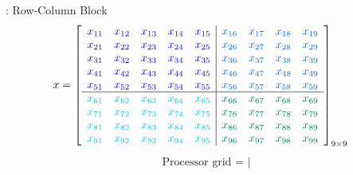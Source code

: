 \begin{frame}
  \begin{exampleblock}{: Row-Column Block}
    \begin{align*}
      x &= \left[
          \begin{array}{lllll|llll}
      \color{g11}x_{11} & \color{g11}x_{12} & \color{g11}x_{13} & 
\color{g11}x_{14} & \color{g11}x_{15} & \color{g12}x_{16} & \color{g12}x_{17} & 
\color{g12}x_{18} & \color{g12}x_{19}\\
      \color{g11}x_{21} & \color{g11}x_{22} & \color{g11}x_{23} & 
\color{g11}x_{24} & \color{g11}x_{25} & \color{g12}x_{26} & \color{g12}x_{27} & 
\color{g12}x_{28} & \color{g12}x_{29}\\
      \color{g11}x_{31} & \color{g11}x_{32} & \color{g11}x_{33} & 
\color{g11}x_{34} & \color{g11}x_{35} & \color{g12}x_{36} & \color{g12}x_{37} & 
\color{g12}x_{38} & \color{g12}x_{39}\\
      \color{g11}x_{41} & \color{g11}x_{42} & \color{g11}x_{43} & 
\color{g11}x_{44} & \color{g11}x_{45} & \color{g12}x_{46} & \color{g12}x_{47} & 
\color{g12}x_{48} & \color{g12}x_{49}\\
      \color{g11}x_{51} & \color{g11}x_{52} & \color{g11}x_{53} & 
\color{g11}x_{54} & \color{g11}x_{55} & \color{g12}x_{56} & \color{g12}x_{57} & 
\color{g12}x_{58} & \color{g12}x_{59}\\\hline
      \color{g13}x_{61} & \color{g13}x_{62} & \color{g13}x_{63} & 
\color{g13}x_{64} & \color{g13}x_{65} & \color{g21}x_{66} & \color{g21}x_{67} & 
\color{g21}x_{68} & \color{g21}x_{69}\\
      \color{g13}x_{71} & \color{g13}x_{72} & \color{g13}x_{73} & 
\color{g13}x_{74} & \color{g13}x_{75} & \color{g21}x_{76} & \color{g21}x_{77} & 
\color{g21}x_{78} & \color{g21}x_{79}\\
      \color{g13}x_{81} & \color{g13}x_{82} & \color{g13}x_{83} & 
\color{g13}x_{84} & \color{g13}x_{85} & \color{g21}x_{86} & \color{g21}x_{87} & 
\color{g21}x_{88} & \color{g21}x_{89}\\
      \color{g13}x_{91} & \color{g13}x_{92} & \color{g13}x_{93} & 
\color{g13}x_{94} & \color{g13}x_{95} & \color{g21}x_{96} & \color{g21}x_{97} & 
\color{g21}x_{98} & \color{g21}x_{99}\\
          \end{array}
      \right]_{9\times 9}
    \end{align*}
    \begin{align*}
      \text{Processor grid = }
      \left|

\end{align*}
\end{exampleblock}
\end{frame}
